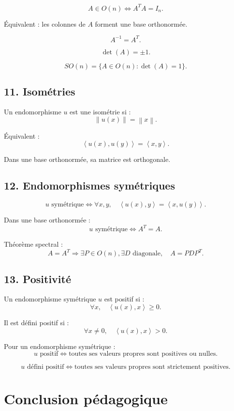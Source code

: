 \documentclass[11pt,a4paper]{article}
\newcommand{\norme}[1]{\left\lVert #1\right\rVert}
\newcommand{\scal}[2]{\left\langle #1,#2\right\rangle}
\begin{document}
\[
A\in O(n)
\Longleftrightarrow
A^TA=I_n.
\]

Équivalent :
les colonnes de \(A\) forment une base orthonormée.

\[
A^{-1}=A^T.
\]

\[
\det(A)=\pm1.
\]

\[
SO(n)=\{A\in O(n):\det(A)=1\}.
\]

\subsection*{11. Isométries}

Un endomorphisme \(u\) est une isométrie si :
\[
\norme{u(x)}=\norme{x}.
\]

Équivalent :
\[
\scal{u(x)}{u(y)}=\scal{x}{y}.
\]

Dans une base orthonormée, sa matrice est orthogonale.

\subsection*{12. Endomorphismes symétriques}

\[
u\text{ symétrique}
\Longleftrightarrow
\forall x,y,\quad
\scal{u(x)}{y}=\scal{x}{u(y)}.
\]

Dans une base orthonormée :
\[
u\text{ symétrique}
\Longleftrightarrow
A^T=A.
\]

Théorème spectral :
\[
A=A^T
\Longrightarrow
\exists P\in O(n),\exists D\text{ diagonale},\quad
A=PDP^T.
\]

\subsection*{13. Positivité}

Un endomorphisme symétrique \(u\) est positif si :
\[
\forall x,\quad \scal{u(x)}{x}\geq0.
\]

Il est défini positif si :
\[
\forall x\neq0,\quad \scal{u(x)}{x}>0.
\]

Pour un endomorphisme symétrique :
\[
u\text{ positif}
\Longleftrightarrow
\text{toutes ses valeurs propres sont positives ou nulles}.
\]

\[
u\text{ défini positif}
\Longleftrightarrow
\text{toutes ses valeurs propres sont strictement positives}.
\]

\section*{Conclusion pédagogique}
\end{document}
